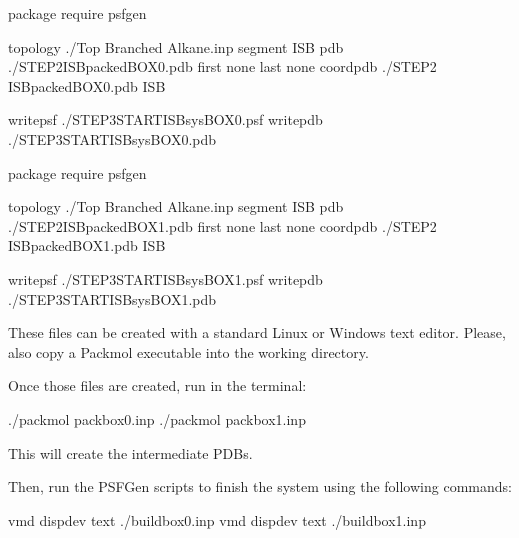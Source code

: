 \documentclass[letterpaper,10pt,english]{sphinxmanual}
\begin{document}

\begin{sphinxVerbatim}[commandchars=\\\{\}]
package require psfgen

topology  ./Top Branched Alkane.inp segment ISB \PYGZob{}
  pdb     ./STEP2\PYGZus{}ISB\PYGZus{}packed\PYGZus{}BOX\PYGZus{}0.pdb
  first   none
  last    none
\PYGZcb{}
coordpdb  ./STEP2 ISB\PYGZus{}packed\PYGZus{}BOX\PYGZus{}0.pdb ISB

writepsf  ./STEP3\PYGZus{}START\PYGZus{}ISB\PYGZus{}sys\PYGZus{}BOX\PYGZus{}0.psf
writepdb  ./STEP3\PYGZus{}START\PYGZus{}ISB\PYGZus{}sys\PYGZus{}BOX\PYGZus{}0.pdb
\end{sphinxVerbatim}


\begin{sphinxVerbatim}[commandchars=\\\{\}]
package require psfgen

topology  ./Top Branched Alkane.inp segment ISB \PYGZob{}
  pdb     ./STEP2\PYGZus{}ISB\PYGZus{}packed\PYGZus{}BOX\PYGZus{}1.pdb
  first   none
  last    none
\PYGZcb{}
coordpdb  ./STEP2 ISB\PYGZus{}packed\PYGZus{}BOX\PYGZus{}1.pdb ISB

writepsf  ./STEP3\PYGZus{}START\PYGZus{}ISB\PYGZus{}sys\PYGZus{}BOX\PYGZus{}1.psf
writepdb  ./STEP3\PYGZus{}START\PYGZus{}ISB\PYGZus{}sys\PYGZus{}BOX\PYGZus{}1.pdb
\end{sphinxVerbatim}

These files can be created with a standard Linux or Windows text editor. Please, also copy a Packmol executable into the working directory.

Once those files are created, run in the terminal:

\begin{sphinxVerbatim}[commandchars=\\\{\}]
\PYGZdl{} ./packmol   \PYGZlt{}   pack\PYGZus{}box\PYGZus{}0.inp
\PYGZdl{} ./packmol   \PYGZlt{}   pack\PYGZus{}box\PYGZus{}1.inp
\end{sphinxVerbatim}

This will create the intermediate PDBs.

Then, run the PSFGen scripts to finish the system using the following commands:

\begin{sphinxVerbatim}[commandchars=\\\{\}]
\PYGZdl{} vmd \PYGZhy{}dispdev text \PYGZlt{} ./build\PYGZus{}box\PYGZus{}0.inp
\PYGZdl{} vmd \PYGZhy{}dispdev text \PYGZlt{} ./build\PYGZus{}box\PYGZus{}1.inp
\end{sphinxVerbatim}
\end{document}
